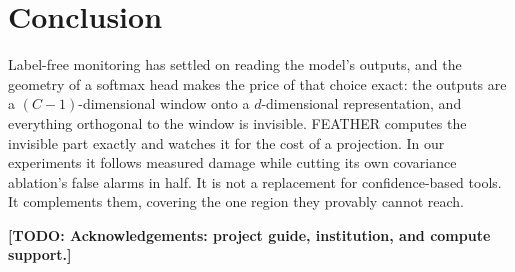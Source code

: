 \documentclass[graybox]{SNmult}
\newcommand{\todo}[1]{\textbf{[TODO: #1]}}
\begin{document}
\section{Conclusion}
\label{sec:conclusion}

Label-free monitoring has settled on reading the model's outputs, and the
geometry of a softmax head makes the price of that choice exact: the outputs
are a $(C-1)$-dimensional window onto a $d$-dimensional representation, and
everything orthogonal to the window is invisible. FEATHER computes the
invisible part exactly and watches it for the cost of a projection. In our
experiments it follows measured damage while cutting its own covariance
ablation's false alarms in half. It is not a replacement for confidence-based
tools. It complements them, covering the one region they provably cannot
reach.

\begin{acknowledgement}
\todo{Acknowledgements: project guide, institution, and compute support.}
\end{acknowledgement}




\end{document}

